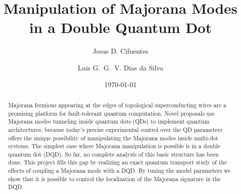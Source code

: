 \documentclass[showpacs,aps,prb,reprint,superscriptaddress]{revtex4-1}
\begin{document}
\newcommand{\be}   {\begin{equation}}
\newcommand{\ee}   {\end{equation}}
\newcommand{\ba}   {\begin{eqnarray}}
\newcommand{\ea}   {\end{eqnarray}}
\newcommand{\ve}  {\varepsilon}

\newcommand{\nhat}{\hat{n}}
\newcommand{\veck}{\textbf{k}}
\newcommand\ep{\epsilon}
\newcommand\g{\gamma}
\newcommand\s{\sigma}
\newcommand\up{\uparrow}
\newcommand\dw{\downarrow}
\newcommand\down{\downarrow}
\newcommand{\ed}[1]{\ep_{d#1}}
\newcommand{\ket}[1]{\vert #1 \rangle}
\newcommand{\ann}{a^{\dagger}}
\newcommand{\dann}{d^{\dagger}}
\newcommand{\tdots}{t_{dots}}
\newcommand{\gammaA}[1]{\gamma_{A,#1}}
\newcommand{\gammaB}[1]{\gamma_{B,#1}}
\newcommand{\Green}[1]{G_{#1}(\omega) }

\newcommand{\GreenG}[2]{G_{#1}^{ #2} (\omega) }

\newcommand{\super}{\vert \Delta \vert}





\title{ Manipulation of Majorana Modes in a Double Quantum Dot }

\author{Jesus D. Cifuentes}
\author{Luis G.~G.~V. Dias da Silva}

\date{ \today }

\begin{abstract}

Majorana fermions appearing at the edges of topological superconducting wires are a promising platform for fault-tolerant quantum computation. Novel proposals use Majorana modes tunneling inside quantum dots (QDs) to implement quantum architectures, because today’s precise experimental control over the QD parameters offers the unique possibility of manipulating the Majorana modes inside multi-dot systems. The simplest case where Majorana manipulation is possible is in a double quantum dot (DQD). So far, no complete analysis of this basic structure has been done. This  project fills this gap by realizing an exact quantum transport study of the effects of coupling a Majorana mode with a DQD. By tuning the model parameters we show that it is possible to control the localization of the Majorana signature in the DQD. 




\end{abstract} 
\end{document}
